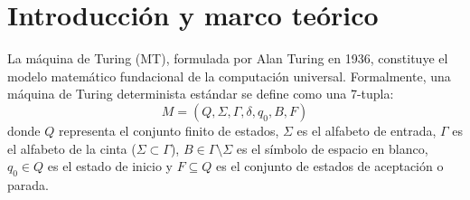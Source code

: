 \documentclass[11pt,letterpaper]{article}
\begin{document}
\newpage
\thispagestyle{plain}

\begin{abstract}
En este informe se presenta el diseño, especificación formal e implementación de un simulador universal de máquinas de Turing deterministas estándar de una cinta infinita bidireccional y cabezal único. El motor interpreta especificaciones en formato YAML basadas en la convención formal de cuádruplas $(\text{origen}, \text{símbolo}, \text{acción}, \text{destino})$, incorporando programación defensiva integral contra especificaciones mal formadas, transiciones no deterministas o entradas inválidas. Asimismo, se documenta la computación paso a paso mediante descripciones instantáneas (IDs), el control de ejecución preventivo con cancelación de ciclos indefinidos, y la demostración formal de la tasa de crecimiento asintótico para dos máquinas originales: un \textit{predecesor binario} ($O(n)$) y un \textit{verificador de palíndromos} ($O(n^2)$).
\end{abstract}

\tableofcontents
\newpage

\section{Introducción y marco teórico}

La máquina de Turing (MT), formulada por Alan Turing en 1936, constituye el modelo matemático fundacional de la computación universal. Formalmente, una máquina de Turing determinista estándar se define como una 7-tupla:
\begin{equation}
M = (Q, \Sigma, \Gamma, \delta, q_0, B, F)
\end{equation}
donde $Q$ representa el conjunto finito de estados, $\Sigma$ es el alfabeto de entrada, $\Gamma$ es el alfabeto de la cinta ($\Sigma \subset \Gamma$), $B \in \Gamma \setminus \Sigma$ es el símbolo de espacio en blanco, $q_0 \in Q$ es el estado de inicio y $F \subseteq Q$ es el conjunto de estados de aceptación o parada.
\end{document}
